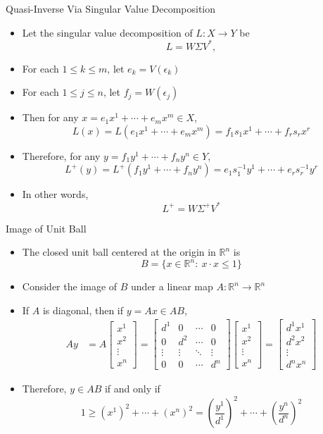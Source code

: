 \documentclass[usenames,dvipsnames,10pt]{beamer}
\newcommand{\R}{\mathbb{R}}
\begin{document}
\begin{frame}
  {Quasi-Inverse Via Singular Value Decomposition}

  \begin{itemize}
  \item Let the singular value decomposition of $L: X \rightarrow Y$ be
    \[
      L = W\Sigma V^*,
    \]
  \item For each $1 \le k \le m$, let $e_k = V(\epsilon_k)$
  \item For each $1 \le j \le n$, let $f_j = W(\epsilon_j)$
  \item Then for any $x = e_1x^1+\cdots+e_mx^m \in X$,
    \[ L(x) = L(e_1x^1+\cdots+e_mx^m) = f_1s_1x^1+\cdots+f_rs_rx^r \]
  \item Therefore, for any $y = f_1y^1+\cdots+f_ny^n \in Y$,
    \[ L^+(y) = L^+(f_1y^1+\cdots+f_ny^n) = e_1s_1^{-1}y^1+\cdots+e_rs_r^{-1}y^r \]
  \item In other words,
    \[ L^+ = W\Sigma^+V^* \]
  \end{itemize}
\end{frame}

\begin{frame}
  {Image of Unit Ball}

  \begin{itemize}
  \item The closed unit ball centered at the origin in $\R^n$ is
    \[ B = \{ x \in \R^n:\ x\cdot x \le 1 \} \]
  \item Consider the image of $B$ under a linear map $A: \R^n \rightarrow \R^n$
  \item If $A$ is diagonal, then if $y = Ax \in AB$,
    \begin{align*}
      Ay &= A\begin{bmatrix}x^1 \\ x^2 \\ \vdots \\ x^n \end{bmatrix}
           = \begin{bmatrix} d^1 & 0 & \cdots & 0 \\ 0 & d^2 & \cdots & 0 \\ \vdots & \vdots & \ddots & \vdots \\ 0 & 0 & \cdots & d^n \end{bmatrix}\begin{bmatrix}x^1 \\ x^2 \\ \vdots \\ x^n \end{bmatrix}
           = \begin{bmatrix} d^1x^1 \\ d^2x^2 \\ \vdots \\ d^nx^n \end{bmatrix}
    \end{align*}
  \item Therefore, $y \in AB$ if and only if
    \[
      1 \ge (x^1)^2 + \cdots + (x^n)^2 = \left(\frac{y^1}{d^1}\right)^2 + \cdots + \left(\frac{y^n}{d^n}\right)^2
    \]
    
  \end{itemize}
\end{frame}
\end{document}
